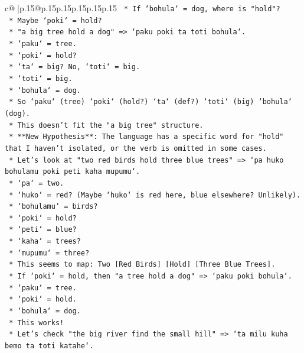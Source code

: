 \documentclass{article}
\begin{document}
{\begin{supertabular}{c@{$\;$}|p{.15\linewidth}@{}p{.15\linewidth}p{.15\linewidth}p{.15\linewidth}p{.15\linewidth}p{.15\linewidth}}
{{{\texttt{        *   If `bohula` = dog, where is "hold"?} \\
\texttt{        *   Maybe `poki` = hold?} \\
\texttt{        *   "a big tree hold a dog" => `paku poki ta toti bohula`.} \\
\texttt{            *   `paku` = tree.} \\
\texttt{            *   `poki` = hold?} \\
\texttt{            *   `ta` = big? No, `toti` = big.} \\
\texttt{            *   `toti` = big.} \\
\texttt{            *   `bohula` = dog.} \\
\texttt{            *   So `paku` (tree) `poki` (hold?) `ta` (def?) `toti` (big) `bohula` (dog).} \\
\texttt{            *   This doesn't fit the "a big tree" structure.} \\
\texttt{    *   **New Hypothesis**: The language has a specific word for "hold" that I haven't isolated, or the verb is omitted in some cases.} \\
\texttt{    *   Let's look at "two red birds hold three blue trees" => `pa huko bohulamu poki peti kaha mupumu`.} \\
\texttt{        *   `pa` = two.} \\
\texttt{        *   `huko` = red? (Maybe `huko` is red here, blue elsewhere? Unlikely).} \\
\texttt{        *   `bohulamu` = birds?} \\
\texttt{        *   `poki` = hold?} \\
\texttt{        *   `peti` = blue?} \\
\texttt{        *   `kaha` = trees?} \\
\texttt{        *   `mupumu` = three?} \\
\texttt{        *   This seems to map: Two {[}Red Birds{]} {[}Hold{]} {[}Three Blue Trees{]}.} \\
\texttt{        *   If `poki` = hold, then "a tree hold a dog" => `paku poki bohula`.} \\
\texttt{            *   `paku` = tree.} \\
\texttt{            *   `poki` = hold.} \\
\texttt{            *   `bohula` = dog.} \\
\texttt{            *   This works!} \\
\texttt{        *   Let's check "the big river find the small hill" => `ta milu kuha bemo ta toti katahe`.} \\
}}}
\end{supertabular}}
\end{document}
